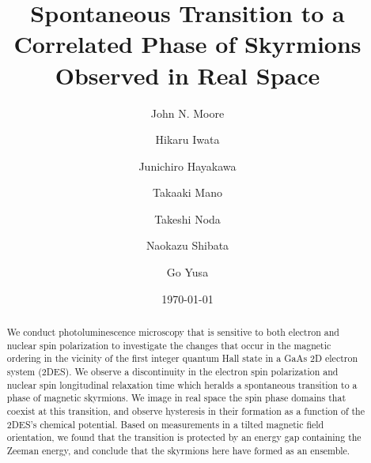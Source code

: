 \documentclass
[aps,prl,twocolumn,superscriptaddress,showpacs,floatfix]{revtex4-1}%
\begin{document}
\title{Spontaneous Transition to a Correlated Phase of Skyrmions Observed in Real Space}
\author{John N. Moore}
\author{Hikaru Iwata}
\author{Junichiro Hayakawa}
\author{Takaaki Mano}
\author{Takeshi Noda}
\author{Naokazu Shibata}
\author{Go Yusa}
\date{\today
}

\begin{abstract}
We conduct photoluminescence microscopy that is sensitive to both electron and nuclear spin polarization to investigate the changes that occur in the magnetic ordering in the vicinity of the first integer quantum Hall state in a GaAs 2D electron system (2DES). We observe a discontinuity in the electron spin polarization and nuclear spin longitudinal relaxation time which heralds a spontaneous transition to a phase of magnetic skyrmions. We image in real space the spin phase domains that coexist at this transition, and observe hysteresis in their formation as a function of the 2DES's chemical potential. Based on measurements in a tilted magnetic field orientation, we found that the transition is protected by an energy gap containing the Zeeman energy, and conclude that the skyrmions here have formed as an ensemble.
\end{abstract}

\maketitle
\end{document}
